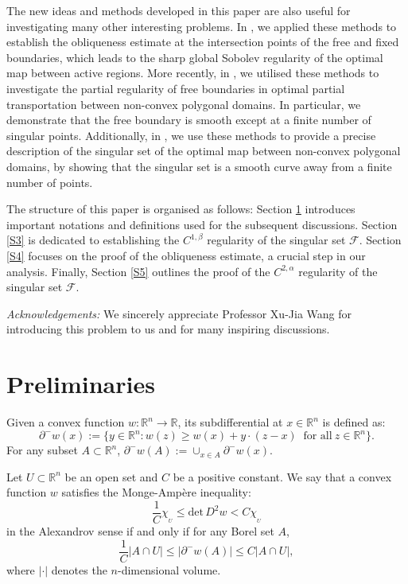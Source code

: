 \documentclass[11pt]{amsart}
\theoremstyle{plain}
\renewcommand{\det}{\mbox{det}}
\newcommand{\0}{\textbf{0}}
\numberwithin{equation}{section}
\numberwithin{equation}{section}
\numberwithin{figure}{section}
\begin{document}
The new ideas and methods developed in this paper are also useful for investigating many other interesting problems. In \cite{CL2}, we applied these methods to establish the obliqueness estimate at the intersection points of the free and fixed boundaries, which leads to the sharp global Sobolev regularity of the optimal map between active regions. More recently, in \cite{CLL}, we utilised these methods to investigate the partial regularity of free boundaries in optimal partial transportation between non-convex polygonal domains. In particular, we demonstrate that the free boundary is smooth except at a finite number of singular points. Additionally, in \cite{CLL}, we use these methods to provide a precise description of the singular set of the optimal map between non-convex polygonal domains, by showing that the singular set is a smooth curve away from a finite number of points.



The structure of this paper is organised as follows: Section \ref{S2} introduces important notations and definitions used for the subsequent discussions. Section \ref{S3} is dedicated to establishing the $C^{1,\beta}$ regularity of the singular set $\mathcal{F}$. Section \ref{S4} focuses on the proof of the obliqueness estimate, a crucial step in our analysis. Finally, Section \ref{S5} outlines the proof of the $C^{2,\alpha}$ regularity of the singular set $\mathcal{F}$.

\vskip5pt 

\noindent\emph{Acknowledgements:} We sincerely appreciate Professor Xu-Jia Wang for introducing this problem to us and for many inspiring discussions.




\section{Preliminaries}\label{S2} 

Given a convex function $w: \mathbb{R}^n \rightarrow \mathbb{R}$, its subdifferential at $x \in \mathbb{R}^n$ is defined as:
\begin{equation}
\partial^{-}w(x) := \{y \in \mathbb{R}^n : w(z) \geq w(x) + y \cdot (z - x) \ \text{ for all} \ z \in \mathbb{R}^n\}.
\end{equation}
For any subset $A\subset\mathbb{R}^n$, $\partial^{-}w(A):=\cup_{x\in A}\partial^{-}w(x)$.

Let $U \subset \mathbb{R}^n$ be an open set and $C$ be a positive constant. 
We say that a convex function $w$ satisfies the Monge-Ampère inequality:
\begin{equation}
\frac{1}{C} \chi_{_U} \leq \det\, D^2w < C \chi_{_U}
\end{equation}
in the Alexandrov sense if and only if for any Borel set $A$,
\begin{equation}\label{aama}
\frac{1}{C} |A \cap U| \leq |\partial^-w(A)| \leq C |A \cap U|,
\end{equation}
where $|\cdot|$ denotes the $n$-dimensional volume. 
\end{document}
